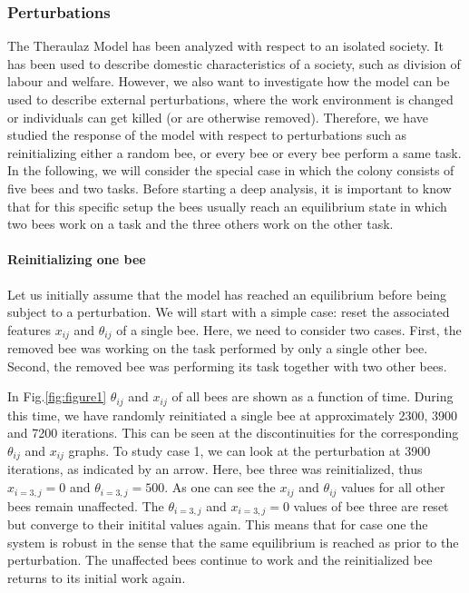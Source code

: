 \subsubsection{Perturbations}
The Theraulaz Model has been analyzed with respect to an isolated society. It has been used to describe domestic characteristics of a society, such as division of labour and welfare. However, we also want to investigate how the model can be used to describe external perturbations, where the work environment is changed or individuals can get killed (or are otherwise removed). Therefore, we have studied the response of the model with respect to perturbations such as reinitializing either a random bee, or every bee or every bee perform a same task.
In the following, we will consider the special case in which the colony consists of five bees and two tasks. Before starting a deep analysis, it is important to know that for this specific setup the bees usually reach an equilibrium state in which two bees work on a task and the three others work on the other task. 

\paragraph{Reinitializing one bee}
Let us initially assume that the model has reached an equilibrium before being subject to a perturbation. We will start with a simple case: reset the associated features $x_{ij}$ and $\theta_{ij}$ of a single bee. Here, we need to consider two cases. First, the removed bee was working on the task performed by only a single other bee. Second, the removed bee was performing its task together with two other bees.

In Fig.\ref{fig:figure1} $\theta_{ij}$ and $x_{ij}$ of all bees are shown as a function of time. During this time, we have randomly reinitiated a single bee at approximately 2300, 3900 and 7200 iterations. This can be seen at the discontinuities for the corresponding $\theta_{ij}$ and $x_{ij}$ graphs. To study case 1, we can look at the perturbation at 3900 iterations, as indicated by an arrow. Here, bee three was reinitialized, thus $x_{i=3,j}=0$ and $\theta_{i=3,j}=500$. As one can see the $x_{ij}$ and $\theta_{ij}$ values for all other bees remain unaffected. The $\theta_{i=3,j}$ and $x_{i=3,j}=0$ values of bee three are reset but converge to their initital values again. This means that for case one the system is robust in the sense that the same equilibrium is reached as prior to the perturbation. The unaffected bees continue to work and the reinitialized bee returns to its initial work again.

